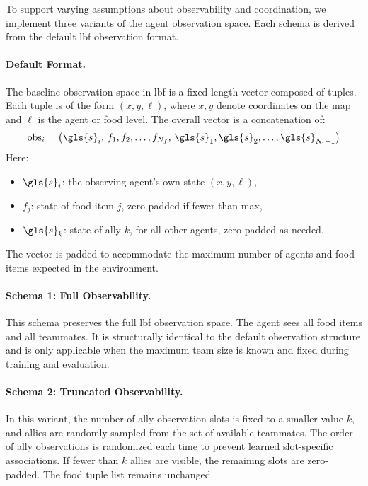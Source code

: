 \documentclass{article}
\begin{document}
To support varying assumptions about observability and coordination, 
we implement three variants of the agent observation space. 
Each schema is derived from the default \gls{lbf} observation format.

\paragraph{Default Format.}
The baseline observation space in \gls{lbf} is a fixed-length vector composed of tuples. 
Each tuple is of the form \((x, y, \ell)\), where \(x, y\) denote coordinates on the map 
and \(\ell\) is the agent or food level. The overall vector is a concatenation of:
\[
\text{obs}_i = \left( \gls{s}_i,\, f_1, f_2, 
    \dots, f_{N_f},\, \gls{s}_1, \gls{s}_2, 
    \dots, \gls{s}_{N_i-1} \right)
\]
Here:
\begin{itemize}
    \item \(\gls{s}_i\): the observing agent's own state \((x, y, \ell)\),
    \item \(f_j\): state of food item \(j\), zero-padded if fewer than max,
    \item \(\gls{s}_k\): state of ally \(k\), for all other agents, zero-padded as needed.
\end{itemize}
The vector is padded to accommodate the maximum number of agents and food items expected 
in the environment.

\paragraph{Schema 1: Full Observability.}
This schema preserves the full \gls{lbf} observation space. 
The agent sees all food items and all teammates. 
It is structurally identical to the default observation structure and is only 
applicable when the maximum team size is known and fixed during training and evaluation.

\paragraph{Schema 2: Truncated Observability.}
In this variant, the number of ally observation slots is fixed to a smaller value \(k\), 
and allies are randomly sampled from the set of available teammates. 
The order of ally observations is randomized each time to prevent learned 
slot-specific associations. If fewer than \(k\) allies are visible, 
the remaining slots are zero-padded. The food tuple list remains unchanged.
\end{document}

